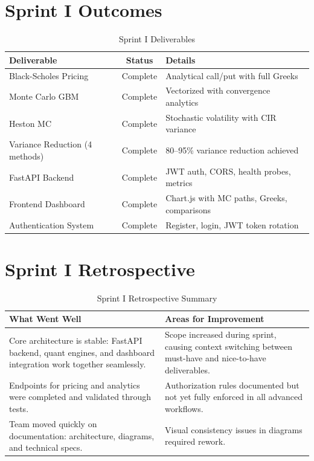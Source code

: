 \documentclass[12pt,a4paper]{report}
\begin{document}
\section{Sprint I Outcomes}

\begin{table}[H]
\centering
\caption{Sprint I Deliverables}
\label{tab:sprint1-outcomes}
\begin{tabularx}{\textwidth}{|l|c|X|}
\hline
\textbf{Deliverable} & \textbf{Status} & \textbf{Details} \\
\hline
Black-Scholes Pricing & Complete & Analytical call/put with full Greeks \\
\hline
Monte Carlo GBM & Complete & Vectorized with convergence analytics \\
\hline
Heston MC & Complete & Stochastic volatility with CIR variance \\
\hline
Variance Reduction (4 methods) & Complete & 80--95\% variance reduction achieved \\
\hline
FastAPI Backend & Complete & JWT auth, CORS, health probes, metrics \\
\hline
Frontend Dashboard & Complete & Chart.js with MC paths, Greeks, comparisons \\
\hline
Authentication System & Complete & Register, login, JWT token rotation \\
\hline
\end{tabularx}
\end{table}

\section{Sprint I Retrospective}

\begin{table}[H]
\centering
\caption{Sprint I Retrospective Summary}
\label{tab:sprint1-retro}
\begin{tabularx}{\textwidth}{|X|X|}
\hline
\textbf{What Went Well} & \textbf{Areas for Improvement} \\
\hline
Core architecture is stable: FastAPI backend, quant engines, and dashboard integration work together seamlessly. & Scope increased during sprint, causing context switching between must-have and nice-to-have deliverables. \\
\hline
Endpoints for pricing and analytics were completed and validated through tests. & Authorization rules documented but not yet fully enforced in all advanced workflows. \\
\hline
Team moved quickly on documentation: architecture, diagrams, and technical specs. & Visual consistency issues in diagrams required rework. \\
\hline
\end{tabularx}
\end{table}
\end{document}
